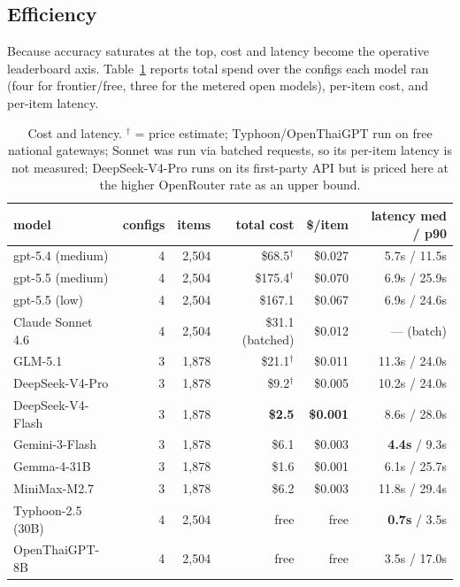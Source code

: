 \documentclass[11pt]{article}
\begin{document}
\subsection{Efficiency}

Because accuracy saturates at the top, cost and latency become the operative leaderboard axis.
Table~\ref{tab:cost} reports total spend over the configs each model ran (four for frontier/free, three
for the metered open models), per-item cost, and per-item latency.

\begin{table}[t]
\centering
\footnotesize
\begin{tabular}{@{}lrrrrr@{}}
\toprule
\textbf{model} & \textbf{configs} & \textbf{items} & \textbf{total cost} & \textbf{\$/item} & \textbf{latency med / p90} \\
\midrule
gpt-5.4 (medium) & 4 & 2{,}504 & \$68.5$^{\dagger}$ & \$0.027 & 5.7s / 11.5s \\
gpt-5.5 (medium) & 4 & 2{,}504 & \$175.4$^{\dagger}$ & \$0.070 & 6.9s / 25.9s \\
gpt-5.5 (low) & 4 & 2{,}504 & \$167.1 & \$0.067 & 6.9s / 24.6s \\
Claude Sonnet 4.6 & 4 & 2{,}504 & \$31.1 (batched) & \$0.012 & --- (batch) \\
GLM-5.1 & 3 & 1{,}878 & \$21.1$^{\dagger}$ & \$0.011 & 11.3s / 24.0s \\
DeepSeek-V4-Pro & 3 & 1{,}878 & \$9.2$^{\dagger}$ & \$0.005 & 10.2s / 24.0s \\
DeepSeek-V4-Flash & 3 & 1{,}878 & \textbf{\$2.5} & \textbf{\$0.001} & 8.6s / 28.0s \\
Gemini-3-Flash & 3 & 1{,}878 & \$6.1 & \$0.003 & \textbf{4.4s} / 9.3s \\
Gemma-4-31B & 3 & 1{,}878 & \$1.6 & \$0.001 & 6.1s / 25.7s \\
MiniMax-M2.7 & 3 & 1{,}878 & \$6.2 & \$0.003 & 11.8s / 29.4s \\
Typhoon-2.5 (30B) & 4 & 2{,}504 & free & free & \textbf{0.7s} / 3.5s \\
OpenThaiGPT-8B & 4 & 2{,}504 & free & free & 3.5s / 17.0s \\
\bottomrule
\end{tabular}
\caption{Cost and latency. $^{\dagger}$ = price estimate; Typhoon/OpenThaiGPT run on free national
gateways; Sonnet was run via batched requests, so its per-item latency is not measured;
DeepSeek-V4-Pro runs on its first-party API but is priced here at the higher OpenRouter rate as an
upper bound.}
\label{tab:cost}
\end{table}
\end{document}
